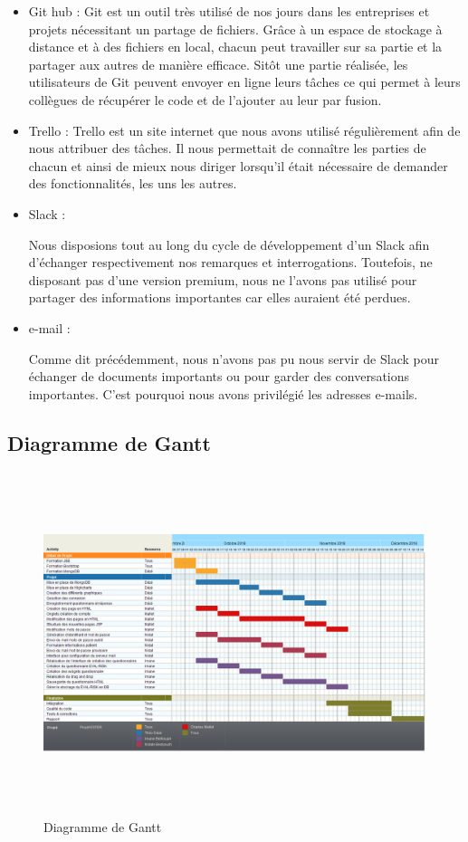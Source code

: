 \begin{itemize}
\item Git hub : 
Git est un outil très utilisé de nos jours dans les entreprises et projets nécessitant un partage de fichiers. Grâce à un espace de stockage à distance et à des fichiers en local, chacun peut travailler sur sa partie et la partager aux autres de manière efficace. Sitôt une partie réalisée, les utilisateurs de Git peuvent envoyer en ligne leurs tâches ce qui permet à leurs collègues de récupérer le code et de l'ajouter au leur par fusion.

\item Trello :
Trello est un site internet que nous avons utilisé régulièrement afin de nous attribuer des tâches. Il nous permettait de connaître les parties de chacun et ainsi de mieux nous diriger lorsqu'il était nécessaire de demander des fonctionnalités, les uns les autres.

\item Slack :

Nous disposions tout au long du cycle de développement d'un Slack afin d'échanger respectivement nos remarques et interrogations. Toutefois, ne disposant pas d'une version premium, nous ne l'avons pas utilisé pour partager des informations importantes car elles auraient été perdues.

\item e-mail :

Comme dit précédemment, nous n'avons pas pu nous servir de Slack pour échanger de documents importants ou pour garder des conversations importantes. C'est pourquoi nous avons privilégié les adresses e-mails.

\end{itemize}


\subsection{Diagramme de Gantt}

\begin{figure}[H]
    \begin{center}
    \includegraphics[height=10.0cm]{img/gantt}
    \end{center}
    \caption{Diagramme de Gantt}
\end{figure}

